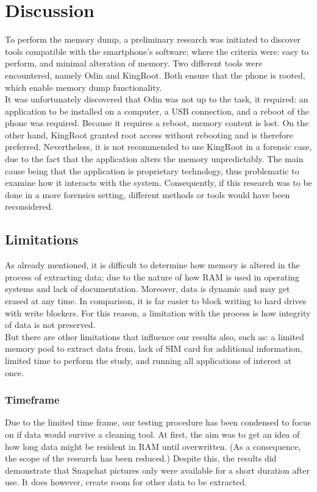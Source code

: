 \section{Discussion}
To perform the memory dump, a preliminary research was initiated to discover tools compatible with the smartphone's software; where the criteria were: easy to perform, and minimal alteration of memory. Two different tools were encountered, namely Odin and KingRoot. Both ensure that the phone is rooted, which enable memory dump functionality.\\
It was unfortunately discovered that Odin was not up to the task, it required: an application to be installed on a computer, a USB connection, and a reboot of the phone was required. Because it requires a reboot, memory content is lost. On the other hand, KingRoot granted root access without rebooting and is therefore preferred. Nevertheless, it is not recommended to use KingRoot in a forensic case, due to the fact that the application alters the memory unpredictably. The main cause being that the application is proprietary technology, thus problematic to examine how it interacts with the system. Consequently, if this research was to be done in a more forensics setting, different methods or tools would have been reconsidered.
\subsection{Limitations}
As already mentioned, it is difficult to determine how memory is altered in the process of extracting data; due to the nature of how RAM is used in operating systems and lack of documentation. Moreover, data is dynamic and may get erased at any time. In comparison, it is far easier to block writing to hard drives with write blockers. For this reason, a limitation with the process is how integrity of data is not preserved.\\
But there are other limitations that influence our results also, such as: a limited memory pool to extract data from, lack of SIM card for additional information, limited time to perform the study, and running all applications of interest at once.

\subsubsection{Timeframe}
Due to the limited time frame, our testing procedure has been condensed to focus on if data would survive a cleaning tool. At first, the aim was to get an idea of how long data might be resident in RAM until overwritten. (As a consequence, the scope of the research has been reduced.) Despite this, the results did demonstrate that Snapchat pictures only were available for a short duration after use. It does however, create room for other data to be extracted.
